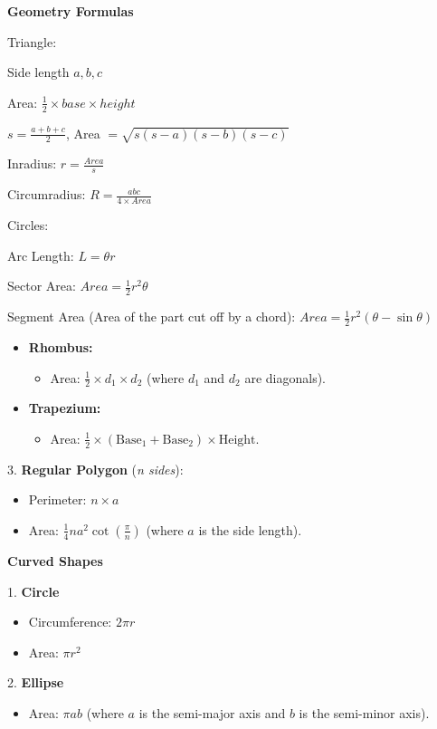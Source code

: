 
\textbf{Geometry Formulas}

Triangle:

Side length $a, b, c$

Area: $\frac{1}{2} \times base \times height$

$s = \frac{a+b+c}{2}$, Area $= \sqrt{s(s-a)(s-b)(s-c)}$

Inradius: $r = \frac{Area}{s}$

Circumradius: $R = \frac{abc}{4 \times Area}$

Circles:

Arc Length: $L = \theta r$

Sector Area: $Area = \frac{1}{2} r^2 \theta$

Segment Area (Area of the part cut off by a chord): $Area = \frac{1}{2} r^2 (\theta - \sin\theta)$

\begin{itemize}
  \item \textbf{Rhombus:}
  \begin{itemize}
    \item Area: $\frac{1}{2} \times d_1 \times d_2$ (where $d_1$ and $d_2$ are diagonals).
  \end{itemize}
  \item \textbf{Trapezium:}
  \begin{itemize}
    \item Area: $\frac{1}{2} \times (\text{Base}_1 + \text{Base}_2) \times \text{Height}$.
  \end{itemize}
\end{itemize}
3. \textbf{Regular Polygon} (\textit{n sides}):
\begin{itemize}
  \item Perimeter: $n \times a$
  \item Area: $\frac{1}{4}na^2 \cot\!\left(\frac{\pi}{n}\right)$ (where $a$ is the side length).
\end{itemize}

\textbf{Curved Shapes}

1. \textbf{Circle}
\begin{itemize}
  \item Circumference: $2\pi r$
  \item Area: $\pi r^2$
\end{itemize}
2. \textbf{Ellipse}
\begin{itemize}
  \item Area: $\pi a b$ (where $a$ is the semi-major axis and $b$ is the semi-minor axis).
\end{itemize}

